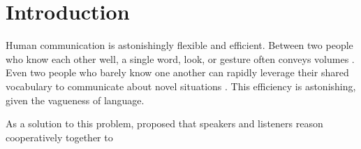 \section{Introduction}

Human communication is astonishingly flexible and efficient. Between two people who know each other well, a single word, look, or gesture often conveys volumes \cite{grice1975,sperber1986,clark1996}. Even two people who barely know one another can rapidly leverage their shared vocabulary to communicate about novel situations \cite{brennan1993}.  This efficiency is astonishing, given the vagueness of language. 

As a solution to this problem,  proposed that speakers and listeners reason cooperatively together to 


